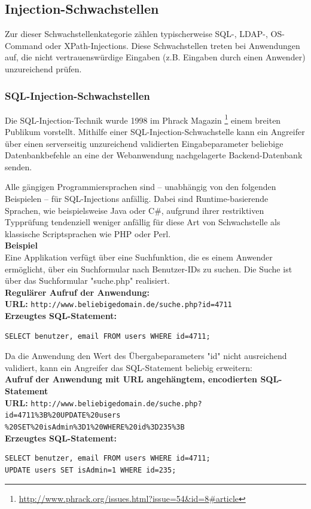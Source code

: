 \subsection{Injection-Schwachstellen}

Zur dieser Schwachstellenkategorie zählen typischerweise SQL-, LDAP-, 
OS-Command oder XPath-Injections. Diese Schwachstellen treten bei 
Anwendungen auf, die nicht vertrauenswürdige Eingaben 
(z.B. Eingaben durch einen Anwender) unzureichend prüfen.


\subsubsection{SQL-Injection-Schwachstellen}

Die SQL-Injection-Technik wurde 1998 im Phrack Magazin
\footnote{\url{http://www.phrack.org/issues.html?issue=54\&id=8\#article}} 
einem breiten Publikum vorstellt. Mithilfe einer SQL-Injection-Schwachstelle 
kann ein Angreifer über einen serverseitig unzureichend 
validierten Eingabeparameter beliebige Datenbankbefehle an eine der 
Webanwendung nachgelagerte Backend-Datenbank senden.

Alle gängigen Programmiersprachen sind – unabhängig von den folgenden 
Beispielen – für SQL-Injections anfällig. Dabei sind Runtime-basierende 
Sprachen, wie beispielsweise Java oder C\#, aufgrund ihrer  restriktiven 
Typprüfung tendenziell weniger anfällig für diese Art von Schwachstelle 
als klassische Scriptsprachen wie PHP oder Perl.
\\
\mbox{}
\textbf{Beispiel}
\\
Eine Applikation verfügt über eine Suchfunktion, die es einem Anwender 
ermöglicht, über ein Suchformular nach Benutzer-IDs zu suchen. 
Die Suche ist über das Suchformular "suche.php" realisiert.
\\
\mbox{}
\textbf{Regulärer Aufruf der Anwendung:}
\mbox{}
\\
\textbf{URL:} \texttt{http://www.beliebigedomain.de/suche.php?id=4711}
\\
\textbf{Erzeugtes SQL-Statement:}
\begin{lstlisting}[basicstyle=\ttfamily\footnotesize]
SELECT benutzer, email FROM users WHERE id=4711;
\end{lstlisting}
Da die Anwendung den Wert des Übergabeparameters "id" nicht ausreichend validiert, kann ein Angreifer das SQL-Statement beliebig erweitern:
\\
\textbf{Aufruf der Anwendung mit URL angehängtem, encodierten SQL-Statement}
\\
\textbf{URL:} \texttt{http://www.beliebigedomain.de/suche.php?id=4711\%3B\%20UPDATE\%20users\\\%20SET\%20isAdmin\%3D1\%20WHERE\%20id\%3D235\%3B}
\\
\textbf{Erzeugtes SQL-Statement:}
\begin{lstlisting}[basicstyle=\ttfamily\footnotesize]
SELECT benutzer, email FROM users WHERE id=4711; 
UPDATE users SET isAdmin=1 WHERE id=235;
\end{lstlisting}


